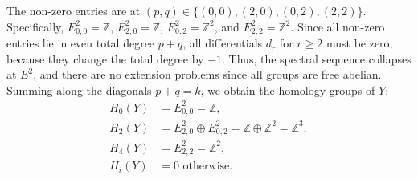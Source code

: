 \documentclass{article}
\begin{document}
\begin{enumerate}[label=\fbox{\arabic*}]
\begin{enumerate}[label=(\arabic*)]
          The non-zero entries are at $(p, q) \in \{ (0, 0), (2, 0), (0, 2), (2, 2) \}$. 
          Specifically, $E^2_{0,0} = \mathbb{Z}$, $E^2_{2,0} = \mathbb{Z}$, $E^2_{0,2} = \mathbb{Z}^2$, and $E^2_{2,2} = \mathbb{Z}^2$.
          Since all non-zero entries lie in even total degree $p+q$, all differentials $d_r$ for $r \ge 2$ must be zero, because they change the total degree by $-1$.
          Thus, the spectral sequence collapses at $E^2$, and there are no extension problems since all groups are free abelian.
          Summing along the diagonals $p+q = k$, we obtain the homology groups of $Y$:
          \begin{align*}
            H_0(Y) &= E^2_{0,0} = \mathbb{Z}, \\
            H_2(Y) &= E^2_{2,0} \oplus E^2_{0,2} = \mathbb{Z} \oplus \mathbb{Z}^2 = \mathbb{Z}^3, \\
            H_4(Y) &= E^2_{2,2} = \mathbb{Z}^2, \\
            H_i(Y) &= 0 \text{ otherwise}.
          \end{align*}
        \end{enumerate}


\end{enumerate}
\end{document}
